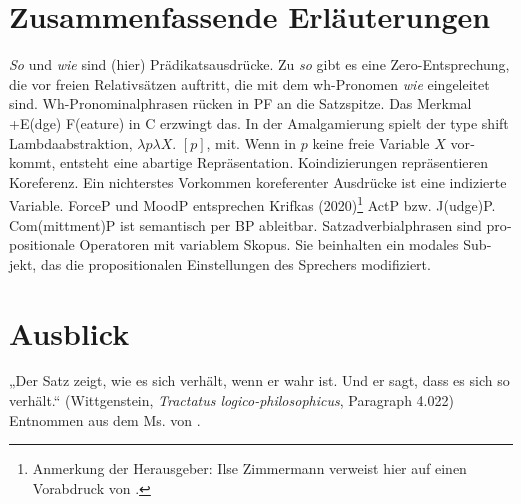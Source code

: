 \documentclass[output=paper, colorlinks, citecolor=brown, booklanguage=german]{langscibook}
\begin{document}
\begin{otherlanguage}{german}
\z

\section{Zusammenfassende Erläuterungen}

\textit{So} und \textit{wie} sind (hier) Prädikatsausdrücke.\newline
Zu \textit{so} gibt es eine Zero-Entsprechung, die vor freien Relativsätzen auftritt, die mit dem wh-Pronomen \textit{wie} eingeleitet sind.\newline
Wh-Pronominalphrasen rücken in PF an die Satzspitze. Das Merkmal +E(dge) F(eature) in C erzwingt das.\newline
In der Amalgamierung spielt der type shift Lambdaabstraktion, $\lambda p \lambda X$. $[p]$, mit. Wenn in $p$ keine freie Variable $X$ vorkommt, entsteht eine abartige Repräsentation.\newline
Koindizierungen repräsentieren Koreferenz. Ein nichterstes Vorkommen ko\-re\-fe\-renter Ausdrücke ist eine indizierte Variable.\newline
ForceP und MoodP entsprechen Krifkas (2020)\footnote{Anmerkung der Herausgeber: Ilse Zimmermann verweist hier auf einen Vorabdruck von \citet{Krifka2023}.} ActP bzw. J(udge)P. \newline Com(mittment)P ist semantisch per BP ableitbar.\newline
Satzadverbialphrasen sind propositionale Operatoren mit variablem Skopus. Sie beinhalten ein modales Subjekt, das die propositionalen Einstellungen des Spre\-chers modifiziert.

\section{Ausblick}
„Der Satz zeigt, wie es sich verhält, wenn er wahr ist. Und er sagt, dass es sich so verhält.“ (Wittgenstein, \textit{Tractatus logico-philosophicus}, Paragraph 4.022)\\

Entnommen aus dem Ms. von \citet[15]{Frey-Pittner2020}. 



%



\end{otherlanguage}
\end{document}
